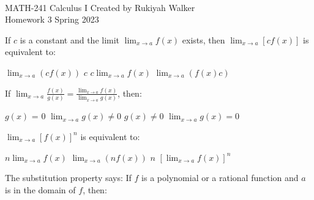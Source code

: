 \documentclass[addpoints, 12pt]{exam}%
\newcommand{\spc}{\vspace*{0.5cm}}
\begin{document}
	\noindent \hrulefill \\
	MATH-241 Calculus I \hfill Created by Rukiyah Walker\\
	Homework 3 \hfill Spring 2023\\ \vspace*{-1cm}
 
	\noindent\hrulefill


\begin{questions}

\vspace*{1cm}

\question[1]

If $c$ is a constant and the limit $\lim_{x \to a} f(x)$ exists, then $\lim_{x \to a} [cf(x)]$ is equivalent to:
    
\begin{choices}
\choice $\lim_{x \to a} (cf(x))$
\choice $c$
\CorrectChoice $c\lim_{x \to a} f(x)$
\choice $\lim_{x \to a} (f(x)c)$
\end{choices}

\spc

\question[1]

If $\lim_{x \to a}\frac{f(x)}{g(x)} = \frac{\lim_{x \to a} f(x)}{\lim_{x \to a} g(x)}$, then:

\begin{choices}
\choice $g(x)$ = 0
\CorrectChoice $\lim_{x \to a} g(x) \neq 0$
\choice $g(x) \neq 0$
\choice $\lim_{x \to a} g(x) = 0$
\end{choices}

\question[1]

$\lim_{x \to a} [f(x)]^n$ is equivalent to:

\begin{choices}
\choice $n\lim_{x \to a} f(x)$
\choice $\lim_{x \to a} (nf(x))$
\choice $n$
\CorrectChoice $[\lim_{x \to a} f(x)]^n$
\end{choices}

\spc

\question[1]

The substitution property says: If $f$ is a polynomial or a rational function and $a$ is in the domain of $f$, then:


\end{questions}
\end{document}
